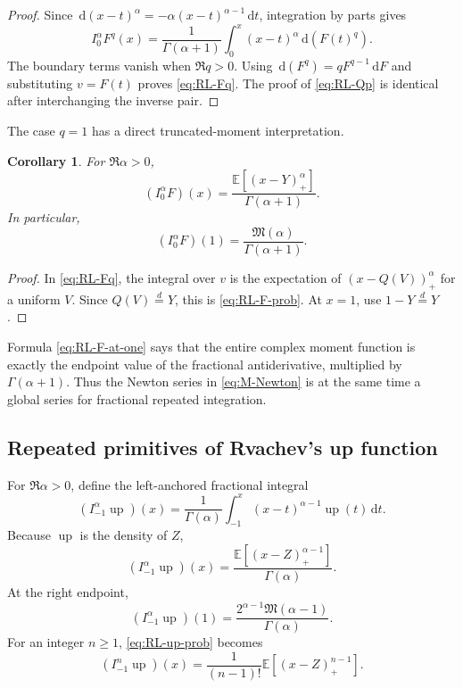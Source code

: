\documentclass[11pt,oneside]{article}
\newtheorem{corollary}[theorem]{Corollary}
\theoremstyle{definition}
\newcommand{\F}{F}
\newcommand{\Q}{Q}
\newcommand{\upf}{\operatorname{up}}
\newcommand{\M}{\mathfrak M}
\newcommand{\E}{\mathbb E}
\newcommand{\dd}{\,\mathrm d}
\begin{document}
\begin{proof}
Since \(\dd(x-t)^\alpha=-\alpha(x-t)^{\alpha-1}\dd t\), integration by parts gives
\[
 I_0^\alpha\F^q(x)
 =\frac1{\Gamma(\alpha+1)}
 \int_0^x(x-t)^\alpha\dd(\F(t)^q).
\]
The boundary terms vanish when \(\Re q>0\).  Using
\(\dd(\F^q)=q\F^{q-1}\dd\F\) and substituting \(v=\F(t)\) proves
\cref{eq:RL-Fq}.  The proof of \cref{eq:RL-Qp} is identical after interchanging the
inverse pair.
\end{proof}

The case \(q=1\) has a direct truncated-moment interpretation.

\begin{corollary}\label{cor:RL-F-prob}
For \(\Re\alpha>0\),
\begin{equation}\label{eq:RL-F-prob}
 (I_0^\alpha\F)(x)
 =\frac{\E[(x-Y)_+^\alpha]}{\Gamma(\alpha+1)}.
\end{equation}
In particular,
\begin{equation}\label{eq:RL-F-at-one}
 (I_0^\alpha\F)(1)
 =\frac{\M(\alpha)}{\Gamma(\alpha+1)}.
\end{equation}
\end{corollary}

\begin{proof}
In \cref{eq:RL-Fq}, the integral over \(v\) is the expectation of
\((x-\Q(V))_+^\alpha\) for a uniform \(V\).  Since \(\Q(V)\overset d=Y\), this is
\cref{eq:RL-F-prob}.  At \(x=1\), use \(1-Y\overset d=Y\).
\end{proof}

Formula \cref{eq:RL-F-at-one} says that the entire complex moment function is exactly
the endpoint value of the fractional antiderivative, multiplied by
\(\Gamma(\alpha+1)\).  Thus the Newton series in \cref{eq:M-Newton} is at the same
time a global series for fractional repeated integration.

\subsection{Repeated primitives of Rvachev's up function}

For \(\Re\alpha>0\), define the left-anchored fractional integral
\begin{equation}\label{eq:RL-up-def}
 (I_{-1}^\alpha\upf)(x)
 =\frac1{\Gamma(\alpha)}\int_{-1}^x(x-t)^{\alpha-1}\upf(t)\dd t.
\end{equation}
Because \(\upf\) is the density of \(Z\),
\begin{equation}\label{eq:RL-up-prob}
 (I_{-1}^\alpha\upf)(x)
 =\frac{\E[(x-Z)_+^{\alpha-1}]}{\Gamma(\alpha)}.
\end{equation}
At the right endpoint,
\begin{equation}\label{eq:RL-up-at-one}
 (I_{-1}^\alpha\upf)(1)
 =\frac{2^{\alpha-1}\M(\alpha-1)}{\Gamma(\alpha)}.
\end{equation}
For an integer \(n\ge1\), \cref{eq:RL-up-prob} becomes
\begin{equation}\label{eq:nth-up-primitive}
 (I_{-1}^n\upf)(x)
 =\frac1{(n-1)!}\E[(x-Z)_+^{n-1}].
\end{equation}
\end{document}
